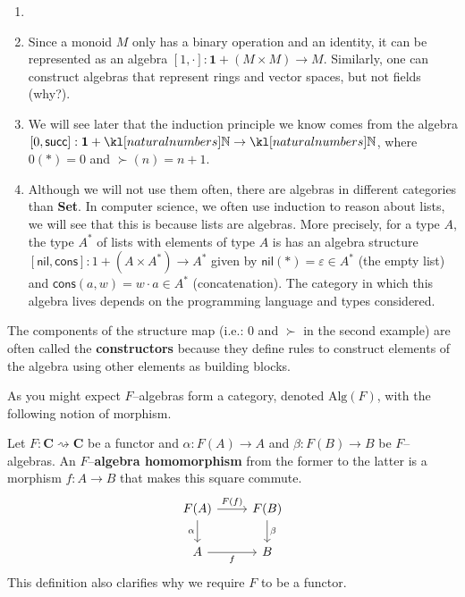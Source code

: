 \documentclass[main.tex]{subfiles}
\begin{document}
\begin{exmps}
	\begin{enumerate}
		\item[]
		\item Since a monoid $M$ only has a binary operation and an identity, it can be represented as an algebra $[1,\cdot] : \mathbf{1} + (M\times M) \rightarrow M$. Similarly, one can construct algebras that represent rings and vector spaces, but not fields (why?).
		\item We will see later that the induction principle we know comes from the algebra $[0,\succ]: \mathbf{1} + \N \rightarrow \N$, where $0(\ast) = 0$ and $\succ(n) = n+1$.
		\item Although we will not use them often, there are algebras in different categories than \textbf{Set}. In computer science, we often use induction to reason about lists, we will see that this is because lists are algebras. More precisely, for a type $A$, the type $A^*$ of lists with elements of type $A$ is has an algebra structure $[\textsf{nil}, \textsf{cons}]: 1+ (A\times A^*) \rightarrow A^*$ given by $\textsf{nil}(*) = \varepsilon \in A^*$ (the empty list) and $\textsf{cons}(a, w) = w\cdot a \in A^*$ (concatenation). The category in which this algebra lives depends on the programming language and types considered.
	\end{enumerate}
\end{exmps}
\begin{rem}
	The components of the structure map (i.e.: $0$ and $\succ$ in the second example) are often called the \textbf{constructors} because they define rules to construct elements of the algebra using other elements as building blocks.
\end{rem}
As you might expect $F$--algebras form a category, denoted $\text{Alg}(F)$, with the following notion of morphism.
\begin{defn}\label{alghom}
	Let $F:\mathbf{C}\rightsquigarrow \mathbf{C}$ be a functor and $\alpha: F(A) \rightarrow A$ and $\beta:F(B) \rightarrow B$ be $F$--algebras. An $F$--\textbf{algebra homomorphism} from the former to the latter is a morphism $f:A\rightarrow B$ that makes this square commute.
	\begin{equation}\label{diag-alghom}
		\begin{tikzcd}
			F(A) \arrow[d, "\alpha"'] \arrow[r, "F(f)"] & F(B) \arrow[d, "\beta"] \\
			A \arrow[r, "f"']                           & B                       
		\end{tikzcd}
	\end{equation}
	This definition also clarifies why we require $F$ to be a functor.
\end{defn}
\end{document}
